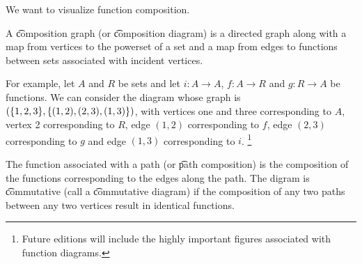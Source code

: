 

We want to visualize function composition.

A \t{composition graph} (or \t{composition diagram}) is a directed graph along with a map from vertices to the powerset of a set and a map from edges to functions between sets associated with incident vertices.

For example, let $A$ and $R$ be sets and let $i: A \to A$, $f: A \to R$ and $g: R \to A$ be functions.
We can consider the diagram whose graph is $(\{1, 2, 3\}, \{(1, 2), (2, 3), (1, 3)\})$, with vertices one and three corresponding to $A$, vertex 2 corresponding to $R$, edge $(1, 2)$ corresponding to $f$, edge $(2, 3)$ corresponding to $g$ and edge $(1, 3)$ corresponding to $i$.
\footnote{Future editions will include the highly important figures associated with function diagrams.}


The function associated with a path (or \t{path composition}) is the composition of the functions corresponding to the edges along the path.
The digram is \t{commutative} (call a \t{commutative diagram}) if the composition of any two paths between any two vertices result in identical functions.

\blankpage
